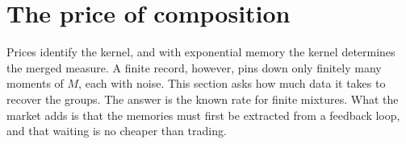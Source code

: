 \section{The price of composition}\label{sec:cost}

Prices identify the kernel, and with exponential memory the kernel determines the merged measure. A finite record, however, pins down only finitely many moments of $M$, each with noise. This section asks how much data it takes to recover the groups. The answer is the known rate for finite mixtures. What the market adds is that the memories must first be extracted from a feedback loop, and that waiting is no cheaper than trading.

